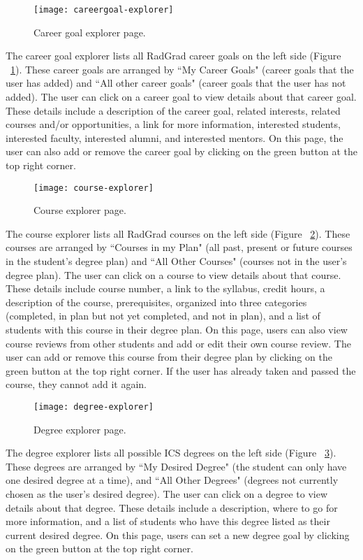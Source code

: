 \begin{figure}[htbp!]
\centering
\texttt{[image: careergoal-explorer]}
\caption{Career goal explorer page.}
\label{career-goal-explorer}
\end{figure}

The career goal explorer lists all RadGrad career goals on the left side (Figure ~\ref{career-goal-explorer}). These career goals are arranged by ``My Career Goals" (career goals that the user has added) and ``All other career goals" (career goals that the user has not added). The user can click on a career goal to view details about that career goal. These details include a description of the career goal, related interests, related courses and/or opportunities, a link for more information, interested students, interested faculty, interested alumni, and interested mentors. On this page, the user can also add or remove the career goal by clicking on the green button at the top right corner.  

\begin{figure}[htbp!]
\centering
\texttt{[image: course-explorer]}
\caption{Course explorer page.}
\label{course-explorer}
\end{figure}

The course explorer lists all RadGrad courses on the left side (Figure ~\ref{course-explorer}). These courses are arranged by ``Courses in my Plan" (all past, present or future courses in the student's degree plan) and ``All Other Courses" (courses not in the user's degree plan). The user can click on a course to view details about that course. These details include course number, a link to the syllabus, credit hours, a description of the course, prerequisites, organized into three categories (completed, in plan but not yet completed, and not in plan), and a list of students with this course in their degree plan. On this page, users can also view course reviews from other students and add or edit their own course review. The user can add or remove this course from their degree plan by clicking on the green button at the top right corner. If the user has already taken and passed the course, they cannot add it again.

\begin{figure}[htbp!]
\centering
\texttt{[image: degree-explorer]}
\caption{Degree explorer page.}
\label{degree-explorer}
\end{figure}

The degree explorer lists all possible ICS degrees on the left side (Figure ~\ref{degree-explorer}). These degrees are arranged by ``My Desired Degree" (the student can only have one desired degree at a time), and ``All Other Degrees" (degrees not currently chosen as the user's desired degree). The user can click on a degree to view details about that degree. These details include a description, where to go for more information, and a list of students who have this degree listed as their current desired degree. On this page, users can set a new degree goal by clicking on the green button at the top right corner.

